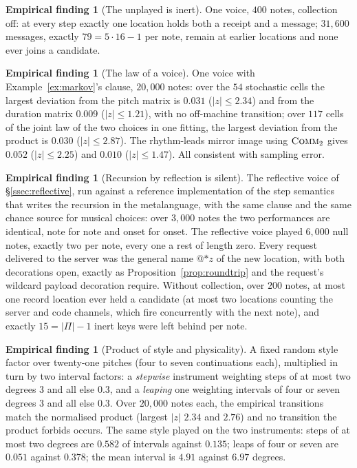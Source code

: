 \documentclass[11pt,a4paper]{article}
\theoremstyle{plain}
\theoremstyle{definition}
\newtheorem{finding}[theorem]{Empirical finding}
\theoremstyle{remark}
\let\oldsc\textsc
\renewcommand{\textsc}[1]{\textup{\oldsc{#1}}}
\newcommand{\Pit}{\Pi}
\newcommand{\drop}{{*}}
\begin{document}
\begin{finding}[The unplayed is inert]\label{find:inert}
One voice, $400$ notes, collection off: at every step exactly one location holds
both a receipt and a message; $31{,}600$ messages, exactly $79 = 5\cdot16-1$ per
note, remain at earlier locations and none ever joins a candidate.
\end{finding}

\begin{finding}[The law of a voice]\label{find:law}
One voice with Example~\ref{ex:markov}'s clause, $20{,}000$ notes: over the
$54$ stochastic cells the largest deviation from the pitch matrix is $0.031$
($|z|\le 2.34$) and from the duration matrix $0.009$ ($|z|\le1.21$), with no
off-machine transition; over $117$ cells of the joint law of the two choices in
one fitting, the largest deviation from the product is $0.030$ ($|z|\le2.87$).
The rhythm-leads mirror image using $\textsc{Comm}_2$ gives $0.052$
($|z|\le2.25$) and $0.010$ ($|z|\le1.47$). All consistent with sampling error.
\end{finding}

\begin{finding}[Recursion by reflection is silent]\label{find:reflective}
The reflective voice of \S\ref{ssec:reflective}, run against a reference
implementation of the step semantics that writes the recursion in the
metalanguage, with the same clause and the same chance source for musical
choices: over $3{,}000$ notes the two performances are identical, note for note
and onset for onset. The reflective voice played $6{,}000$ null notes, exactly
two per note, every one a rest of length zero. Every request delivered to the server was the
general name $@{\drop z}$ of the new location, with both decorations open,
exactly as Proposition~\ref{prop:roundtrip} and the request's wildcard payload
decoration require. Without collection, over $200$
notes, at most one record location ever held a candidate (at most two locations
counting the server and code channels, which fire concurrently with the next
note), and exactly $15 = |\Pit|-1$ inert keys were left behind per note.
\end{finding}

\begin{finding}[Product of style and physicality]\label{find:convolution}
A fixed random style factor over twenty-one pitches (four to seven
continuations each), multiplied in turn by two interval factors: a
\emph{stepwise} instrument weighting steps of at most two degrees $3$ and all
else $0.3$, and a \emph{leaping} one weighting intervals of four or seven
degrees $3$ and all else $0.3$. Over $20{,}000$ notes each, the empirical
transitions match the normalised product (largest $|z|$ $2.34$ and $2.76$) and
no transition the product forbids occurs. The same style played on the two
instruments: steps of at most two degrees are $0.582$ of intervals against
$0.135$; leaps of four or seven are $0.051$ against $0.378$; the mean interval
is $4.91$ against $6.97$ degrees.
\end{finding}
\end{document}
